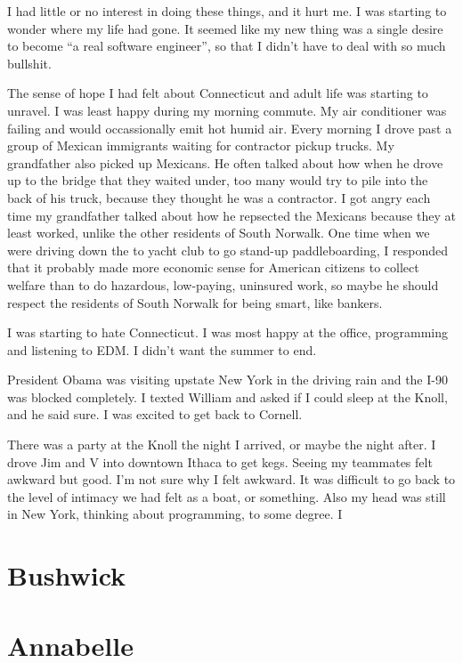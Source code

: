 \documentclass[12pt]{article}
\begin{document}
I had little or no interest in doing these things, and it hurt me.  I was
starting to wonder where my life had gone.  It seemed like my new thing was
a single desire to become ``a real software engineer'', so that I didn't have to
deal with so much bullshit.  

The sense of hope I had felt about Connecticut and adult life was starting to
unravel.  I was least happy during my morning commute.  My air conditioner was
failing and would occassionally emit hot humid air.  Every morning I drove past
a group of Mexican immigrants waiting for contractor pickup trucks.  My
grandfather also picked up Mexicans.  He often talked about how when he drove up
to the bridge that they waited under, too many would try to pile into the back
of his truck, because they thought he was a contractor.  I got angry each time
my grandfather talked about how he repsected the Mexicans because they at least
worked, unlike the other residents of South Norwalk.  One time when we were
driving down the to yacht club to go stand-up paddleboarding, I responded that
it probably made more economic sense for American citizens to collect welfare
than to do hazardous, low-paying, uninsured work, so maybe he should respect the
residents of South Norwalk for being smart, like bankers. 

I was starting to hate Connecticut.  I was most happy at the office, programming
and listening to EDM.  I didn't want the summer to end.

President Obama was visiting upstate New York in the driving rain and the I-90
was blocked completely.  I texted William and asked if I could sleep at the
Knoll, and he said sure.  I was excited to get back to Cornell.

There was a party at the Knoll the night I arrived, or maybe the night after.  I
drove Jim and V into downtown Ithaca to get kegs.  Seeing my teammates felt
awkward but good.  I'm not sure why I felt awkward.  It was difficult to go back
to the level of intimacy we had felt as a boat, or something.  Also my head was
still in New York, thinking about programming, to some degree.  I  


\section{Bushwick}


\section{Annabelle}
\end{document}

